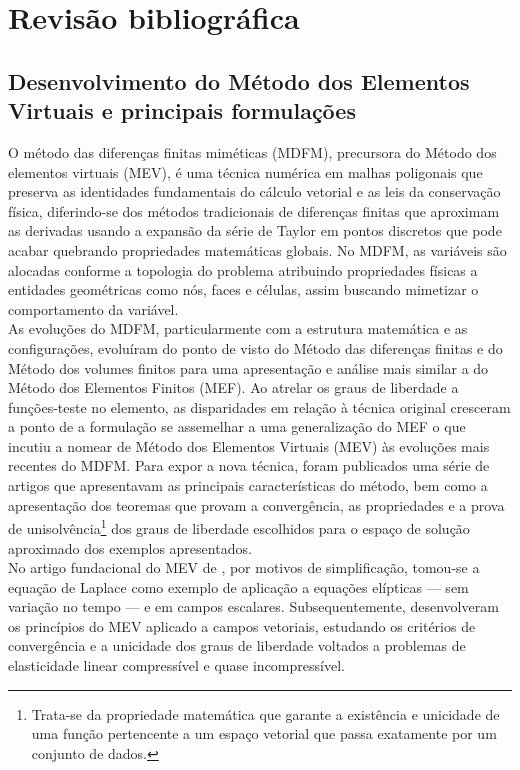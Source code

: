 \chapter{ Revisão bibliográfica}
\label{cap:2}

\section{Desenvolvimento do Método dos Elementos Virtuais e principais formulações}

\indent O método das diferenças finitas miméticas (MDFM), precursora do Método dos elementos virtuais (MEV), é uma técnica numérica em malhas poligonais que preserva as identidades fundamentais do cálculo vetorial e as leis da conservação física, diferindo-se dos métodos tradicionais de diferenças finitas que aproximam as derivadas usando a expansão da série de Taylor em pontos discretos que pode acabar quebrando propriedades matemáticas globais. No MDFM, as variáveis são alocadas conforme a topologia do problema atribuindo propriedades físicas a entidades geométricas como nós, faces e células, assim buscando mimetizar o comportamento da variável. \\
\indent As evoluções do MDFM, particularmente com a estrutura matemática e as configurações, evoluíram do ponto de visto do Método das diferenças finitas e do Método dos volumes finitos para uma apresentação e análise mais similar a do Método dos Elementos Finitos (MEF). Ao atrelar os graus de liberdade a funções-teste no elemento, as disparidades em relação à técnica original cresceram a ponto de a formulação se assemelhar a uma generalização do MEF o que incutiu \citet{basicprinciplesvirtualelementmethods2013a} a nomear de Método dos Elementos Virtuais (MEV) às evoluções mais recentes do MDFM. Para expor a nova técnica, foram publicados uma série de artigos que apresentavam as principais características do método, bem como a apresentação dos teoremas que provam a convergência, as propriedades e a prova de unisolvência\footnote{Trata-se da propriedade matemática que garante a existência e unicidade de uma função pertencente a um espaço vetorial que passa exatamente por um conjunto de dados.} dos graus de liberdade escolhidos para o espaço de solução aproximado dos exemplos apresentados.\\
\indent No artigo fundacional do MEV de \citet{basicprinciplesvirtualelementmethods2013a}, por motivos de simplificação, tomou-se a equação de Laplace como exemplo de aplicação a equações elípticas — sem variação no tempo — e em campos escalares. Subsequentemente, \citet{virtualelementslinearelasticityproblems2013} desenvolveram os princípios do MEV aplicado a campos vetoriais, estudando os critérios de convergência e a unicidade dos graus de liberdade voltados a problemas de elasticidade linear compressível e quase incompressível.  \\
